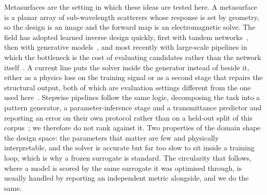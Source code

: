 \documentclass[pdflatex,oneside,sn-mathphys-num]{sn-jnl}
\theoremstyle{thmstyleone}
\theoremstyle{thmstyletwo}
\theoremstyle{thmstylethree}
\begin{document}
Metasurfaces are the setting in which these ideas are tested here. A metasurface is a
planar array of sub-wavelength scatterers whose response is set by geometry, so the
design is an image and the forward map is an electromagnetic solve. The field has
adopted learned inverse design quickly, first with tandem
networks~\cite{tandem,structuralcolor}, then with generative
models~\cite{genmodel}, and most recently with large-scale pipelines in which the
bottleneck is the cost of evaluating candidates rather than the network
itself~\cite{largescale,vr,roadmap,revisit}. A current line puts the solver inside the
generator instead of beside it, either as a physics loss on the training signal or as a
second stage that repairs the structural output, both of which are evaluation settings
different from the one used here~\cite{mxdiffusion}. Stepwise pipelines follow the same
logic, decomposing the task into a pattern generator, a parameter-inference stage and a
transmittance predictor and reporting an error on their own protocol rather than on a
held-out split of this corpus~\cite{metasr}; we therefore do not rank against it. Two properties of the domain shape the
design space: the parameters that matter are few and physically interpretable, and the
solver is accurate but far too slow to sit inside a training loop, which is why a frozen
surrogate is standard. The circularity that follows, where a model is scored by the same
surrogate it was optimised through, is usually handled by reporting an independent
metric alongside, and we do the same.
\end{document}
